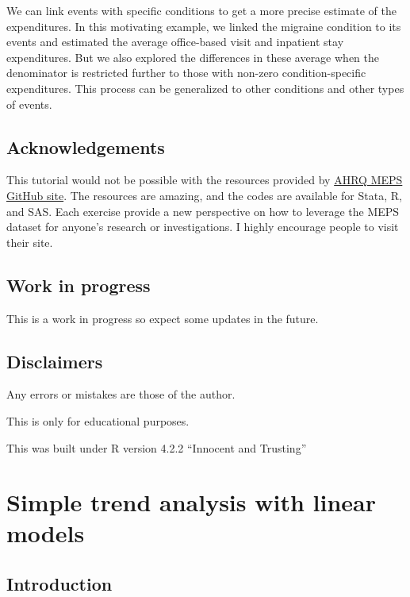 \documentclass[
]{book}
\begin{document}
We can link events with specific conditions to get a more precise estimate of the expenditures. In this motivating example, we linked the migraine condition to its events and estimated the average office-based visit and inpatient stay expenditures. But we also explored the differences in these average when the denominator is restricted further to those with non-zero condition-specific expenditures. This process can be generalized to other conditions and other types of events.

\hypertarget{acknowledgements-3}{%
\section{Acknowledgements}\label{acknowledgements-3}}

This tutorial would not be possible with the resources provided by \href{https://github.com/HHS-AHRQ/MEPS}{AHRQ MEPS GitHub site}. The resources are amazing, and the codes are available for Stata, R, and SAS. Each exercise provide a new perspective on how to leverage the MEPS dataset for anyone's research or investigations. I highly encourage people to visit their site.

\hypertarget{work-in-progress}{%
\section{Work in progress}\label{work-in-progress}}

This is a work in progress so expect some updates in the future.

\hypertarget{disclaimers}{%
\section{Disclaimers}\label{disclaimers}}

Any errors or mistakes are those of the author.

This is only for educational purposes.

This was built under R version 4.2.2 ``Innocent and Trusting''

\hypertarget{trends}{%
\chapter{Simple trend analysis with linear models}\label{trends}}

\hypertarget{introduction-4}{%
\section{Introduction}\label{introduction-4}}
\end{document}
